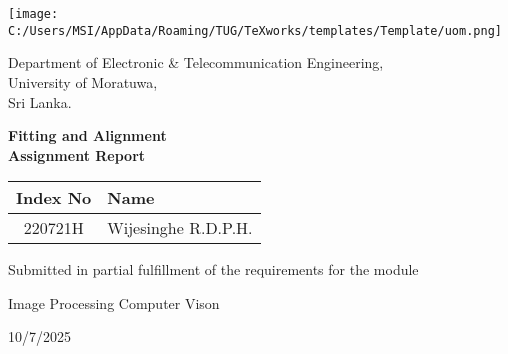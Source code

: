 \documentclass[12pt,a4paper]{article}
\begin{document}
\begin{titlepage}

    \centering
    \vspace{0.5cm}
    \texttt{[image: C:/Users/MSI/AppData/Roaming/TUG/TeXworks/templates/Template/uom.png]} \\ 
    \par\vspace{0.02cm}
    \large Department of Electronic \& Telecommunication Engineering,\\
    University of Moratuwa, \\ Sri Lanka.
    \par\vspace{2cm}

    {\LARGE\bfseries 
   Fitting and Alignment\\ \Large 
    Assignment Report \par

    }
    \vspace{2cm}

    \begin{center}
    \begin{tabular}{|c|p{5cm}|}
        \hline
        \textbf{Index No} & \textbf{Name} \\
        \hline
        220721H & Wijesinghe R.D.P.H. \\
        \hline
    \end{tabular}
    \end{center}
    \vspace{1.5cm}
    {Submitted in partial fulfillment of the requirements for the module\par}
    {Image Processing Computer Vison \par}

    \vspace{1.0cm}
    {\large 10/7/2025\par}
    \vfill
\end{titlepage}
\end{document}
